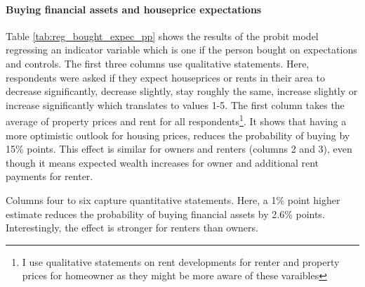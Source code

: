 \documentclass[ProjectABM]{subfiles}
\begin{document}
%



\paragraph{Buying financial assets and houseprice expectations}
Table \ref{tab:reg_bought_expec_pp} shows the results of the probit model regressing an indicator variable which is one if the person bought on expectations and controls. The first three columns use qualitative statements. Here, respondents were asked if they expect houseprices or rents in their area to decrease significantly, decrease slightly, stay roughly the same, increase slightly or increase significantly which translates to values 1-5. The first column takes the average of property prices and rent for all respondents\footnote{I use qualitative statements on rent developments for renter and property prices for homeowner as they might be more aware of these varaibles}. It shows that having a more optimistic outlook for housing prices, reduces the probability of buying by 15\% points. This effect is similar for owners and renters (columns 2 and 3), even though it means expected wealth increases for owner and additional rent payments for renter.%

Columns four to six capture quantitative statements. Here, a 1\% point higher estimate reduces the probability of buying financial assets by 2.6\% points. Interestingly, the effect is stronger for renters than owners.
\end{document}
